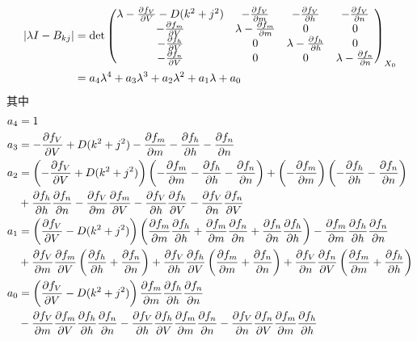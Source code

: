 \documentclass[
pdflinks,
]{xjtuthesis}
\begin{document}
\begin{align}
|\lambda I - B _{kj}|
& = \det 
\left(
\begin{matrix} 
\lambda - \pfr{f_V}{V} - D(k^2+j^2) & -\pfr{f_V}{m} & -\pfr{f_V}{h} & -\pfr{f_V}{n} \\ 
-\pfr{f_m}{V} & \lambda - \pfr{f_m}{m} & 0 & 0 \\ 
-\pfr{f_h}{V} & 0 & \lambda - \pfr{f_h}{h} & 0 \\
-\pfr{f_n}{V} & 0 & 0 & \lambda - \pfr{f_n}{n}
\end{matrix}
\right) _{X_0} \\
\notag &= a_4 \lambda^4 + a_3 \lambda^3 + a_2 \lambda^2 + a_1 \lambda +a_0
\end{align}
其中
\begin{align*}
a_4 &= 1 \\
a_3 &= -\pfr{f_V}{V} + D(k^2 + j^2) - \pfr{f_m}{m} - \pfr{f_h}{h} - \pfr{f_n}{n} \\
a_2 &= \left(-\pfr{f_V}{V}+D(k^2+j^2)\right) \left(-\pfr{f_m}{m} - \pfr{f_h}{h} - \pfr{f_n}{n}\right) + \left(-\pfr{f_m}{m}\right) 
\left(-\pfr{f_h}{h} - \pfr{f_n}{n}\right)\\
&+ \pfr{f_h}{h} \pfr{f_n}{n} - \pfr{f_V}{m} \pfr{f_m}{V} - \pfr{f_V}{h} \pfr{f_h}{V} - \pfr{f_V}{n} \pfr{f_n}{V} \\
a_1 &= \left(\pfr{f_V}{V} - D(k^2+j^2)\right)
\left(\pfr{f_m}{m} \pfr{f_h}{h} + \pfr{f_m}{m} \pfr{f_n}{n} + \pfr{f_n}{n} \pfr{f_h}{h}\right) - \pfr{f_m}{m} \pfr{f_h}{h} \pfr{f_n}{n}\\
&+ \pfr{f_V}{m} \pfr{f_m}{V} \left(\pfr{f_h}{h} + \pfr{f_n}{n}\right)
+ \pfr{f_V}{h} \pfr{f_h}{V} \left(\pfr{f_m}{m} + \pfr{f_n}{n}\right)
+ \pfr{f_V}{n} \pfr{f_n}{V} \left(\pfr{f_m}{m} + \pfr{f_h}{h}\right)\\
a_0 &= \left(\pfr{f_V}{V} - D(k^2 + j^2)\right) 
\pfr{f_m}{m} \pfr{f_h}{h} \pfr{f_n}{n} \\
&-\pfr{f_V}{m} \pfr{f_m}{V} \pfr{f_h}{h} \pfr{f_n}{n}
-\pfr{f_V}{h} \pfr{f_h}{V} \pfr{f_m}{m} \pfr{f_n}{n}
-\pfr{f_V}{n} \pfr{f_n}{V} \pfr{f_m}{m} \pfr{f_h}{h}
\end{align*}
\end{document}
